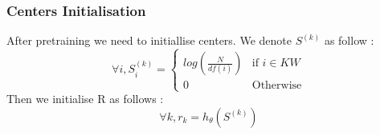 \subsubsection{Centers Initialisation}
After pretraining we need to initiallise centers. We denote $S^{(k)}$ as follow :
\begin{equation}
\forall i, S^{(k)}_i = \left\{
    \begin{array}{ll}
        log\left(\frac{N}{df(i)}\right) & \mbox{if } i \in KW \\
        0 & \mbox{Otherwise}
    \end{array}
\right.
\end{equation}
Then we initialise R as follows :
\begin{equation}
\forall k, r_k =  h_\theta(S^{(k)})
\end{equation}
